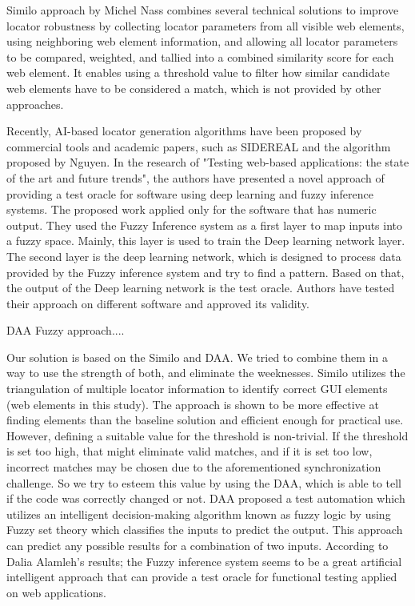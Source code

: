 \documentclass{article}
\begin{document}
Similo approach by Michel Nass\cite{similo} combines several technical solutions to improve locator robustness by collecting locator parameters from all visible web elements, using neighboring web element information, and allowing all locator parameters to be compared, weighted, and tallied into a combined similarity score for each web element. It enables using a threshold value to filter how similar candidate web elements have to be considered a match, which is not provided by other approaches.

Recently, AI-based locator generation algorithms have been proposed by commercial tools and academic papers\cite{ai_in_testing}, such as SIDEREAL\cite{sidereal} and the algorithm proposed by Nguyen\cite{nguyen}.
In the research of "Testing web-based applications: the state of the art and future trends"\cite{state_of_art}, the authors have presented a novel approach of providing a test oracle for software using deep learning and fuzzy inference systems. The proposed work applied only for the software that has numeric output. They used the Fuzzy Inference system as a first layer to map inputs into a fuzzy space. Mainly, this layer is used to train the Deep learning network layer. The second layer is the deep learning network, which is designed to process data provided by the Fuzzy inference system and try to find a pattern. Based on that, the output of the Deep learning network is the test oracle. Authors have tested their approach on different software and approved its validity.

DAA Fuzzy approach\cite{fuzzy_ai_in_web_testing}....

Our solution is based on the Similo\cite{similo} and DAA\cite{fuzzy_ai_in_web_testing}. We tried to combine them in a way to use the strength of both, and eliminate the weeknesses. Similo\cite{similo} utilizes the triangulation of multiple locator information to identify correct GUI elements (web elements in this study). The approach is shown to be more effective at finding elements than the baseline solution and efficient enough for practical use. However, defining a suitable value for the threshold is non-trivial. If the threshold is set too high, that might eliminate valid matches, and if it is set too low, incorrect matches may be chosen due to the aforementioned synchronization challenge. So we try to esteem this value by using the DAA\cite{fuzzy_ai_in_web_testing}, which is able to tell if the code was correctly changed or not. DAA\cite{fuzzy_ai_in_web_testing} proposed a test automation which utilizes an intelligent decision-making algorithm known as fuzzy logic by using Fuzzy set theory which classifies the inputs to predict the output. This approach can predict any possible results for a combination of two inputs. According to Dalia Alamleh's results\cite{fuzzy_ai_in_web_testing}; the Fuzzy inference system seems to be a great artificial intelligent approach that can provide a test oracle for functional testing applied on web applications.
\end{document}
